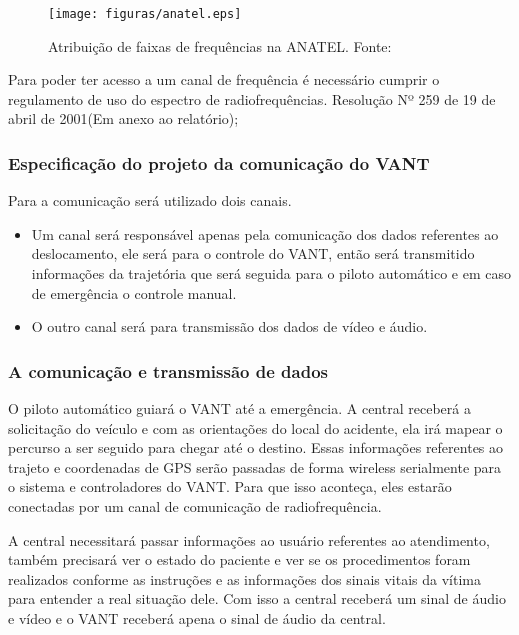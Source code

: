 \begin{figure}[h!]
	\centering
	  \texttt{[image: figuras/anatel.eps]}
	\caption{Atribuição de faixas de frequências na ANATEL. Fonte: \cite{anatel}}
	\label{fig:tabela}
\end{figure}


Para poder ter acesso a um canal de frequência é necessário cumprir o regulamento de uso do espectro de radiofrequências. Resolução Nº 259 de 19 de abril de 2001(Em anexo ao relatório);

\subsubsection{Especificação do projeto da comunicação do VANT}

Para a comunicação será utilizado dois canais.

\begin{itemize}
	\item Um canal será responsável apenas pela comunicação dos dados referentes ao deslocamento, ele será para o controle do VANT, então será transmitido informações da trajetória que será seguida para o piloto automático e em caso de emergência o controle manual.
	\item O outro canal será para transmissão dos dados de vídeo e áudio.
\end{itemize}

\subsubsection{A comunicação e transmissão de dados }

O piloto automático guiará o VANT até a emergência. A central receberá a solicitação do veículo e com as orientações do local do acidente, ela irá mapear o percurso a ser seguido para chegar até o destino.  Essas informações referentes ao trajeto e coordenadas de GPS serão passadas de forma wireless serialmente para o sistema e controladores do VANT. Para que isso aconteça, eles estarão conectadas por um canal de comunicação de radiofrequência.

A central necessitará passar informações ao usuário referentes ao atendimento, também precisará ver o estado do paciente e ver se os procedimentos foram realizados conforme as instruções e as informações dos sinais vitais da vítima para entender a real situação dele. Com isso a central receberá um sinal de áudio e vídeo e o VANT receberá apena o sinal de áudio da central. 

